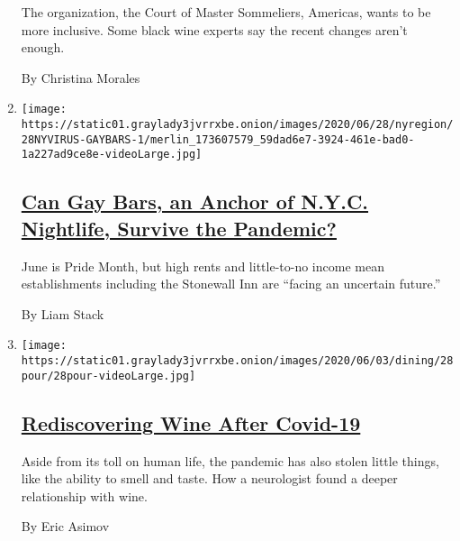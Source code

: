 \begin{enumerate}
  The organization, the Court of Master Sommeliers, Americas, wants to
  be more inclusive. Some black wine experts say the recent changes
  aren't enough.

  By Christina Morales
\item
  \texttt{[image: https://static01.graylady3jvrrxbe.onion/images/2020/06/28/nyregion/28NYVIRUS-GAYBARS-1/merlin\_173607579\_59dad6e7-3924-461e-bad0-1a227ad9ce8e-videoLarge.jpg]}

  \hypertarget{can-gay-bars-an-anchor-of-nyc-nightlife-survive-the-pandemic}{%
  \subsection{\texorpdfstring{\href{/2020/06/20/nyregion/nyc-gay-bars-pride.html}{Can
  Gay Bars, an Anchor of N.Y.C. Nightlife, Survive the
  Pandemic?}}{Can Gay Bars, an Anchor of N.Y.C. Nightlife, Survive the Pandemic?}}\label{can-gay-bars-an-anchor-of-nyc-nightlife-survive-the-pandemic}}

  June is Pride Month, but high rents and little-to-no income mean
  establishments including the Stonewall Inn are ``facing an uncertain
  future.''

  By Liam Stack
\item
  \texttt{[image: https://static01.graylady3jvrrxbe.onion/images/2020/06/03/dining/28pour/28pour-videoLarge.jpg]}

  \hypertarget{rediscovering-wine-after-covid-19}{%
  \subsection{\texorpdfstring{\href{/2020/05/28/dining/drinks/wine-coronavirus-sense-of-smell.html}{Rediscovering
  Wine After
  Covid-19}}{Rediscovering Wine After Covid-19}}\label{rediscovering-wine-after-covid-19}}

  Aside from its toll on human life, the pandemic has also stolen little
  things, like the ability to smell and taste. How a neurologist found a
  deeper relationship with wine.

  By Eric Asimov
\end{enumerate}

